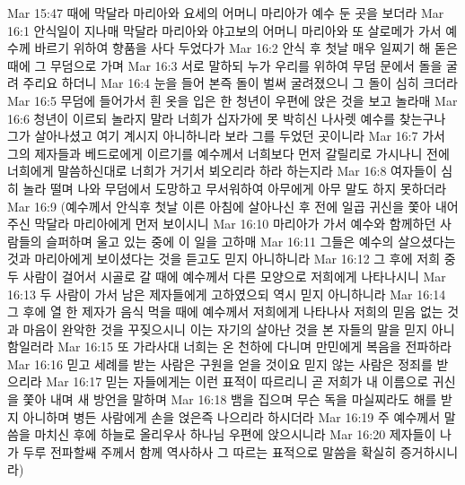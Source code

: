 Mar 15:47  때에 막달라 마리아와 요세의 어머니 마리아가 예수 둔 곳을 보더라
Mar 16:1  안식일이 지나매 막달라 마리아와 야고보의 어머니 마리아와 또 살로메가 가서 예수께 바르기 위하여 향품을 사다 두었다가
Mar 16:2  안식 후 첫날 매우 일찌기 해 돋은 때에 그 무덤으로 가며
Mar 16:3  서로 말하되 누가 우리를 위하여 무덤 문에서 돌을 굴려 주리요 하더니
Mar 16:4  눈을 들어 본즉 돌이 벌써 굴려졌으니 그 돌이 심히 크더라
Mar 16:5  무덤에 들어가서 흰 옷을 입은 한 청년이 우편에 앉은 것을 보고 놀라매
Mar 16:6  청년이 이르되 놀라지 말라 너희가 십자가에 못 박히신 나사렛 예수를 찾는구나 그가 살아나셨고 여기 계시지 아니하니라 보라 그를 두었던 곳이니라
Mar 16:7  가서 그의 제자들과 베드로에게 이르기를 예수께서 너희보다 먼저 갈릴리로 가시나니 전에 너희에게 말씀하신대로 너희가 거기서 뵈오리라 하라 하는지라
Mar 16:8  여자들이 심히 놀라 떨며 나와 무덤에서 도망하고 무서워하여 아무에게 아무 말도 하지 못하더라
Mar 16:9  (예수께서 안식후 첫날 이른 아침에 살아나신 후 전에 일곱 귀신을 쫓아 내어 주신 막달라 마리아에게 먼저 보이시니
Mar 16:10  마리아가 가서 예수와 함께하던 사람들의 슬퍼하며 울고 있는 중에 이 일을 고하매
Mar 16:11  그들은 예수의 살으셨다는 것과 마리아에게 보이셨다는 것을 듣고도 믿지 아니하니라
Mar 16:12  그 후에 저희 중 두 사람이 걸어서 시골로 갈 때에 예수께서 다른 모양으로 저희에게 나타나시니
Mar 16:13  두 사람이 가서 남은 제자들에게 고하였으되 역시 믿지 아니하니라
Mar 16:14  그 후에 열 한 제자가 음식 먹을 때에 예수께서 저희에게 나타나사 저희의 믿음 없는 것과 마음이 완악한 것을 꾸짖으시니 이는 자기의 살아난 것을 본 자들의 말을 믿지 아니함일러라
Mar 16:15  또 가라사대 너희는 온 천하에 다니며 만민에게 복음을 전파하라
Mar 16:16  믿고 세례를 받는 사람은 구원을 얻을 것이요 믿지 않는 사람은 정죄를 받으리라
Mar 16:17  믿는 자들에게는 이런 표적이 따르리니 곧 저희가 내 이름으로 귀신을 쫓아 내며 새 방언을 말하며
Mar 16:18  뱀을 집으며 무슨 독을 마실찌라도 해를 받지 아니하며 병든 사람에게 손을 얹은즉 나으리라 하시더라
Mar 16:19  주 예수께서 말씀을 마치신 후에 하늘로 올리우사 하나님 우편에 앉으시니라
Mar 16:20  제자들이 나가 두루 전파할쌔 주께서 함께 역사하사 그 따르는 표적으로 말씀을 확실히 증거하시니라)


